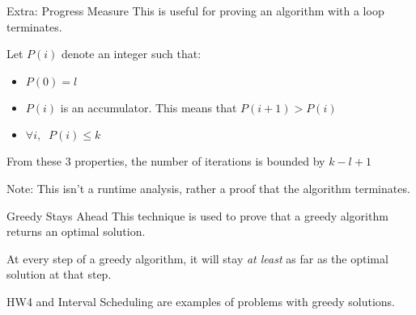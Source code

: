 \documentclass{beamer}
\begin{document}
    \begin{frame}{Extra: Progress Measure}
        This is useful for proving an algorithm with a loop terminates.
        \bigskip

        Let $P(i)$ denote an integer such that:
        \begin{itemize}
            \item<3-> $P(0) = l$ 
            \item<4-> $P(i)$ is an accumulator. This means that $P(i + 1) > P(i)$
            \item<5-> $\forall i,\;\; P(i) \leq k$
        \end{itemize}
        From these 3 properties, the number of iterations is bounded by $k - l + 1$
        \bigskip

        Note: This isn't a runtime analysis, rather a proof that the algorithm terminates.
    \end{frame}
    \begin{frame}{Greedy Stays Ahead}
        This technique is used to prove that a greedy algorithm returns an optimal solution.
        \bigskip

        At every step of a greedy algorithm, it will stay \textit{at least} as far as the optimal solution at that step.
        \bigskip

        HW4  and Interval Scheduling are examples of problems with greedy solutions.
    \end{frame}
\end{document}
